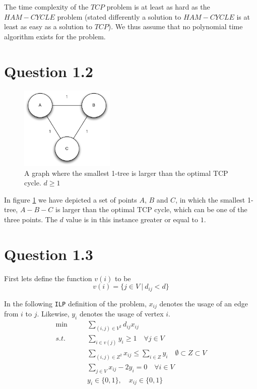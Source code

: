 \documentclass[10pt]{article}
\begin{document}
The time complexity of the $TCP$ problem is at least as hard as the $HAM-CYCLE$ problem (stated differently a solution to $HAM-CYCLE$ is at least as easy as a solution to $TCP$). We thus assume that no polynomial time algorithm exists for the problem.


\section*{Question 1.2} %
\label{sec:question_1_2}

\begin{figure}
	\centering
	\includegraphics[width=0.4\textwidth]{figures/unicycle.pdf}
	\caption{A graph where the smallest 1-tree is larger than the optimal TCP cycle. $d \geq 1$}
	\label{unicycle}
\end{figure}
In figure \ref{unicycle} we have depicted a set of points $A$, $B$ and $C$, in which the smallest 1-tree, $A-B-C$ is larger than the optimal TCP cycle, which can be one of the three points.
The $d$ value is in this instance greater or equal to $1$.

\section*{Question 1.3} %
\label{sec:question_1_3}
First lets define the function $v(i)$ to be
\begin{equation}
   v(i) = \{ j \in V\ |\ d_{ij} < d \}
\end{equation}

In the following \texttt{ILP} definition of the problem, $x_{ij}$ denotes the usage of an edge from $i$ to $j$.
Likewise, $y_i$ denotes the usage of vertex $i$.
\begin{align}
\min &\qquad \sum_{(i,j) \in V^2} d_{ij} x_{ij} \nonumber\\
s.t. &\qquad \sum_{i \in v(j)} y_i \geq 1 \quad \forall j \in V \nonumber\\
	 &\qquad \sum_{(i,j) \in Z^2} x_{ij} \leq \sum_{i \in Z} y_i \quad \emptyset \subset Z \subset V \nonumber\\
	 &\qquad \sum_{j \in V } x_{ij} - 2 y_i = 0 \quad \forall i \in V \nonumber\\
	 &\qquad y_i \in \{0,1\}, \quad x_{ij} \in \{0,1\} \nonumber
\end{align}
\end{document}
